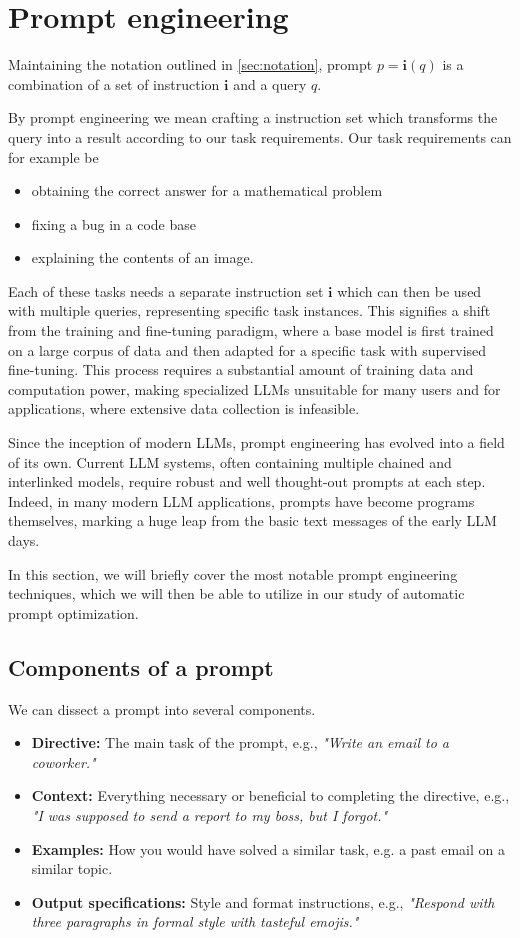 \section{Prompt engineering}
Maintaining the notation outlined in \ref{sec:notation}, prompt $p = \mathbf{i}(q)$ is a combination 
of a set of instruction $\mathbf{i}$ and a query $q$. 

By prompt engineering we mean crafting a instruction set which 
transforms the query into a result according to our task requirements.
Our task requirements can for example be
\begin{itemize}
    \item obtaining the correct answer for a mathematical problem
    \item fixing a bug in a code base
    \item explaining the contents of an image.
\end{itemize}
Each of these tasks needs a separate instruction set $\mathbf{i}$ which can then be used with multiple queries,
representing specific task instances. This signifies a shift from the training and fine-tuning paradigm, where 
a base model is first trained on a large corpus of data and then adapted for a specific task with supervised fine-tuning.
This process requires a substantial amount of training data and computation power, making specialized LLMs unsuitable
for many users and for applications, where extensive data collection is infeasible.


Since the inception of modern LLMs, prompt engineering has evolved into a field of its own. Current LLM systems, often containing
multiple chained and interlinked models, require robust and well thought-out prompts at each step. 
Indeed, in many modern LLM applications, prompts have become programs themselves\cite{schnabel2024symbolicpromptprogramsearch}, 
marking a huge leap from the basic text messages of the early LLM days.

In this section, we will briefly cover the most notable prompt engineering techniques, which we will then
be able to utilize in our study of automatic prompt optimization.
\newpage
\subsection{Components of a prompt}
We can dissect a prompt into several components\cite{schulhoff2024promptreportsystematicsurvey}.
\begin{itemize}
    \item \textbf{Directive:} The main task of the prompt, e.g., \textit{"Write an email to a coworker."}
    \item \textbf{Context:} Everything necessary or beneficial to completing the directive, e.g., \textit{"I was supposed to send a report to my boss, but I forgot."}
    \item \textbf{Examples:} How you would have solved a similar task, e.g. a past email on a similar topic.
    \item \textbf{Output specifications:} Style and format instructions, e.g., \textit{"Respond with three paragraphs in formal style with tasteful emojis."}
\end{itemize}

